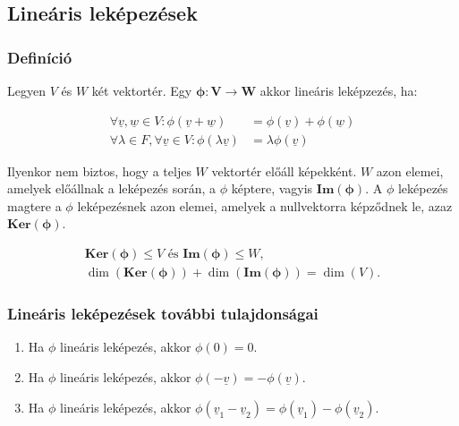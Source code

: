 \documentclass{article}
\begin{document}
\newpage

\subsection{Lineáris leképezések}

\subsubsection{Definíció}

Legyen $V$ és $W$ két vektortér. Egy $\mathbf{\phi : V \rightarrow W}$ akkor lineáris leképzezés, ha:

\begin{align*}
    \forall \underline{v}, \underline{w} \in V: \phi(\underline{v} + \underline{w}) &= \phi(\underline{v}) + \phi(\underline{w}) \\
    \forall \lambda \in F, \forall \underline{v} \in V: \phi (\lambda\underline{v}) &= \lambda\phi(\underline{v})
\end{align*}

Ilyenkor nem biztos, hogy a teljes $W$ vektortér előáll képekként. $W$ azon elemei, amelyek előállnak a leképezés során, a $\phi$ képtere, vagyis $\mathbf{Im(\phi)}$. \newline A $\phi$ leképezés magtere a $\phi$ leképezésnek azon elemei, amelyek a nullvektorra képződnek le, azaz $\mathbf{Ker(\phi)}$.

\begin{gather*}
    \mathbf{Ker(\phi)} \leq V \text{ és } \mathbf{Im(\phi)} \leq W, \\
    \dim(\mathbf{Ker(\phi)}) + \dim(\mathbf{Im(\phi)}) = \dim(V).
\end{gather*}

\subsubsection{Lineáris leképezések további tulajdonságai}

\begin{enumerate}
    \item Ha $\phi$ lineáris leképezés, akkor $\phi(0) = 0$.
    \item Ha $\phi$ lineáris leképezés, akkor $\phi(-\underline{v}) = -\phi(\underline{v})$.
    \item Ha $\phi$ lineáris leképezés, akkor $\phi(\underline{v}_1 - \underline{v}_2) = \phi(\underline{v}_1) - \phi(\underline{v}_2)$.
\end{enumerate}
\end{document}
